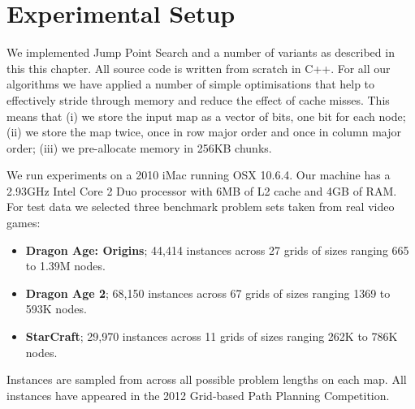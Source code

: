 \section{Experimental Setup}
\label{sec::setup}
We implemented Jump Point Search and a number of variants as described
in this this chapter. All source code is written from scratch in C++.
For all our algorithms we have applied a number of simple optimisations 
that help to effectively stride through memory and reduce the effect of 
cache misses.
This means that (i) we store the input map as a vector of bits, one bit 
for each node; (ii) we store the map twice, once in row major order and 
once in column major order; (iii) we pre-allocate memory in 256KB chunks.

We run experiments on a 2010 iMac running OSX 10.6.4. Our machine has 
a 2.93GHz Intel Core 2 Duo processor with 6MB of L2 cache and 4GB of RAM.
For test data we selected three benchmark problem sets taken from
real video games: 
\begin{itemize}
\item \textbf{Dragon Age: Origins}; 44,414 instances across 27 grids of 
sizes ranging 665 to 1.39M nodes.
\item \textbf{Dragon Age 2}; 68,150 instances across 67 grids of sizes 
ranging 1369 to 593K nodes.
\item \textbf{StarCraft}; 29,970 instances across 11 grids of sizes 
ranging 262K to 786K nodes.
\end{itemize}
Instances are sampled from across all possible problem lengths on each map.
All instances have appeared in the 2012 Grid-based Path Planning Competition. 
%
